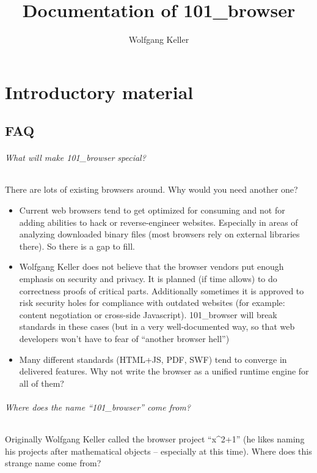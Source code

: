\documentclass[10pt]{scrbook}
\author{Wolfgang Keller}
\title{Documentation of 101\_browser}
\begin{document}
\maketitle
\tableofcontents

\part{Introductory material}

\chapter{FAQ}

\paragraph{What will make 101\_browser special?}

There are lots of existing browsers around. Why would you need another one?
\begin{itemize}
\item Current web browsers tend to get optimized for consuming and not for adding abilities to hack or reverse-engineer websites. Especially in areas of analyzing downloaded binary files (most browsers rely on external libraries there). So there is a gap to fill.
\item Wolfgang Keller does not believe that the browser vendors put enough emphasis on security and privacy. It is planned (if time allows) to do correctness proofs of critical parts. Additionally sometimes it is approved to risk security holes for compliance with outdated websites (for example: content negotiation or cross-side Javascript). 101\_browser will break standards in these cases (but in a very well-documented way, so that web developers won't have to fear of "`another browser hell"')
\item Many different standards (HTML+JS, PDF, SWF) tend to converge in delivered features. Why not write the browser as a unified runtime engine for all of them?
\end{itemize}

\paragraph{Where does the name "`101\_browser"' come from?}

Originally Wolfgang Keller called the browser project "`x\^{}2+1"' (he likes naming his projects after mathematical objects -- especially at this time). Where does this strange name come from?
\end{document}

